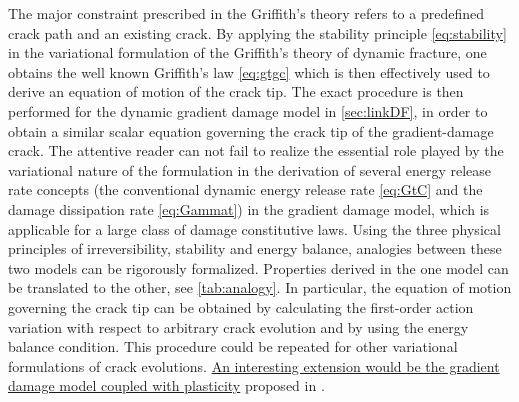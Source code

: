 The major constraint prescribed in the Griffith's theory refers to a predefined crack path and an existing crack. By applying the stability principle \eqref{eq:stability} in the variational formulation of the Griffith's theory of dynamic fracture, one obtains the well known Griffith's law \eqref{eq:gtgc} which is then effectively used to derive an equation of motion of the crack tip. The exact procedure is then performed for the dynamic gradient damage model in \cref{sec:linkDF}, in order to obtain a similar scalar equation governing the crack tip of the gradient-damage crack. The attentive reader can not fail to realize the essential role played by the variational nature of the formulation in the derivation of several energy release rate concepts (the conventional dynamic energy release rate \eqref{eq:GtC} and the damage dissipation rate \eqref{eq:Gammat}) in the gradient damage model, which is applicable for a large class of damage constitutive laws. Using the three physical principles of irreversibility, stability and energy balance, analogies between these two models can be rigorously formalized. Properties derived in the one model can be translated to the other, see \cref{tab:analogy}. In particular, the equation of motion governing the crack tip can be obtained by calculating the first-order action variation with respect to arbitrary crack evolution and by using the energy balance condition. This procedure could be repeated for other variational formulations of crack evolutions. \uline{An interesting extension would be the gradient damage model coupled with plasticity} proposed in \cite{AlessiMarigoVidoli:2015}.
